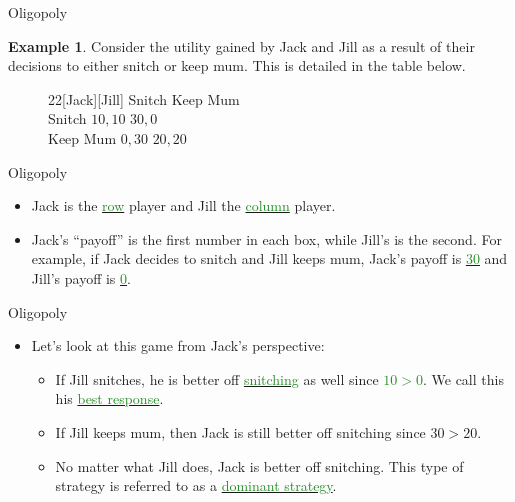 \documentclass[xcolor={dvipsnames},pdf, hyperref={colorlinks=true, citecolor=ForestGreen, linkcolor=BlueViolet, urlcolor=Magenta}, handout]{beamer}
\theoremstyle{definition}
\newtheorem{exmp}{Example}[section]
\newcommand{\dd}[1]{{\underline{\textcolor{ForestGreen}{#1}}}}
\begin{document}
\begin{frame}{Oligopoly}
	\begin{exmp}
		\small
	Consider the utility gained by Jack and Jill as a result of their decisions to either snitch or keep mum. This is detailed in the table below.
	
\renewcommand{\gamestretch}{1.5}
\sgcolsep=25pt
\begin{figure}[h]\hspace*{\fill}%
	\begin{game}{2}{2}[Jack][Jill] 
		\>  Snitch \> Keep Mum \\
		Snitch \> $10, 10$ \> $30, 0$ \\
		Keep Mum \> $0, 30$ \> $20, 20$
	\end{game} 
	\hspace*{\fill}%
\end{figure}
	
	
\end{exmp} 
\end{frame}

\begin{frame}{Oligopoly}
\begin{itemize}
	\item 	Jack is the \dd{row} player and Jill the \dd{column} player.
	\item Jack's ``payoff'' is the first number in each box, while Jill's is the second. For example, if Jack decides to snitch and Jill keeps mum, Jack's payoff is \dd{30} and Jill's payoff is \dd{0}.
\end{itemize}
\end{frame}

\begin{frame}{Oligopoly}
	\begin{itemize}

		\item Let's look at this game from Jack's perspective: 
		\begin{itemize}
			\item If Jill snitches, he is better off \dd{snitching} as well since \dd{$10 > 0$}. We call this his \dd{best response}. 
			\item If Jill keeps mum, then Jack is still better off snitching since $30>20$. 
			\item No matter what Jill does, Jack is better off snitching. This type of strategy is referred to as a \dd{dominant strategy}. 
		\end{itemize}
	
	\end{itemize}
\end{frame}
\end{document}
